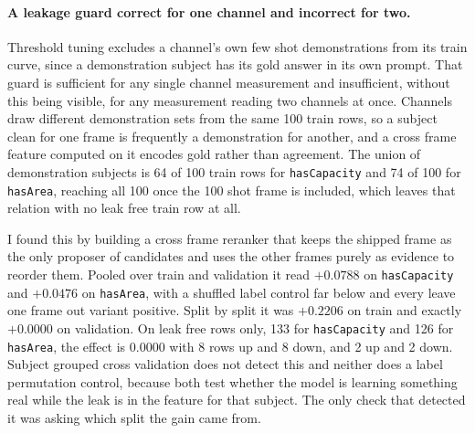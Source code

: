 \documentclass[11pt]{article}
\begin{document}
\paragraph{A leakage guard correct for one channel and incorrect for two.}
Threshold tuning excludes a channel's own few shot demonstrations from its train
curve, since a demonstration subject has its gold answer in its own prompt. That
guard is sufficient for any single channel measurement and insufficient, without
this being visible, for any measurement reading two channels at once. Channels
draw different demonstration sets from the same 100 train rows, so a subject
clean for one frame is frequently a demonstration for another, and a cross frame
feature computed on it encodes gold rather than agreement. The union of
demonstration subjects is 64 of 100 train rows for \texttt{hasCapacity} and 74 of
100 for \texttt{hasArea}, reaching all 100 once the 100 shot frame is included,
which leaves that relation with no leak free train row at all.

I found this by building a cross frame reranker that keeps the shipped frame as
the only proposer of candidates and uses the other frames purely as evidence to
reorder them. Pooled over train and validation it read $+0.0788$ on
\texttt{hasCapacity} and $+0.0476$ on \texttt{hasArea}, with a shuffled label
control far below and every leave one frame out variant positive. Split by split
it was $+0.2206$ on train and exactly $+0.0000$ on validation. On leak free rows
only, 133 for \texttt{hasCapacity} and 126 for \texttt{hasArea}, the effect is
0.0000 with 8 rows up and 8 down, and 2 up and 2 down. Subject grouped cross
validation does not detect this and neither does a label permutation control,
because both test whether the model is learning something real while the leak is
in the feature for that subject. The only check that detected it was asking which
split the gain came from.
\end{document}
